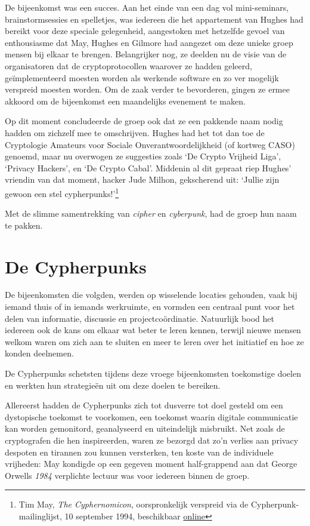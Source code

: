 \documentclass[
  a5paper,
  smalldemyvopaper,11pt,twoside,onecolumn,openright,extrafontsizes,
hidelinks]{memoir}
\begin{document}
De bijeenkomst was een succes. Aan het einde van een dag vol
mini-seminars, brainstormsessies en spelletjes, was iedereen die het
appartement van Hughes had bereikt voor deze speciale gelegenheid,
aangestoken met hetzelfde gevoel van enthousiasme dat May, Hughes en
Gilmore had aangezet om deze unieke groep mensen bij elkaar te brengen.
Belangrijker nog, ze deelden nu de visie van de organisatoren dat de
cryptoprotocollen waarover ze hadden geleerd, geïmplementeerd moesten
worden als werkende software en zo ver mogelijk verspreid moesten
worden. Om de zaak verder te bevorderen, gingen ze ermee akkoord om de
bijeenkomst een maandelijks evenement te maken.

Op dit moment concludeerde de groep ook dat ze een pakkende naam nodig
hadden om zichzelf mee te omschrijven. Hughes had het tot dan toe de
Cryptologie Amateurs voor Sociale Onverantwoordelijkheid (of kortweg
CASO) genoemd, maar nu overwogen ze suggesties zoals `De Crypto Vrijheid
Liga', `Privacy Hackers', en `De Crypto Cabal'. Middenin al dit gepraat
riep Hughes' vriendin van dat moment, hacker Jude Milhon, gekscherend
uit: `Jullie zijn gewoon een stel cypherpunks!'\footnote{Tim May,
  \emph{The Cyphernomicon}, oorspronkelijk verspreid via de
  Cypherpunk-mailinglijst, 10 september 1994, beschikbaar
  \href{https://cdn.nakamotoinstitute.org/docs/cyphernomicon.txt}{online}}

Met de slimme samentrekking van \emph{cipher} en \emph{cyberpunk}, had
de groep hun naam te pakken.

\section{De Cypherpunks}\label{de-cypherpunks}

De bijeenkomsten die volgden, werden op wisselende locaties gehouden,
vaak bij iemand thuis of in iemands werkruimte, en vormden een centraal
punt voor het delen van informatie, discussie en projectcoördinatie.
Natuurlijk bood het iedereen ook de kans om elkaar wat beter te leren
kennen, terwijl nieuwe mensen welkom waren om zich aan te sluiten en
meer te leren over het initiatief en hoe ze konden deelnemen.

De Cypherpunks schetsten tijdens deze vroege bijeenkomsten toekomstige
doelen en werkten hun strategieën uit om deze doelen te bereiken.

Allereerst hadden de Cypherpunks zich tot dusverre tot doel gesteld om
een dystopische toekomst te voorkomen, een toekomst waarin digitale
communicatie kan worden gemonitord, geanalyseerd en uiteindelijk
misbruikt. Net zoals de cryptografen die hen inspireerden, waren ze
bezorgd dat zo'n verlies aan privacy despoten en tirannen zou kunnen
versterken, ten koste van de individuele vrijheden: May kondigde op een
gegeven moment half-grappend aan dat George Orwells \emph{1984}
verplichte lectuur was voor iedereen binnen de groep.
\end{document}
